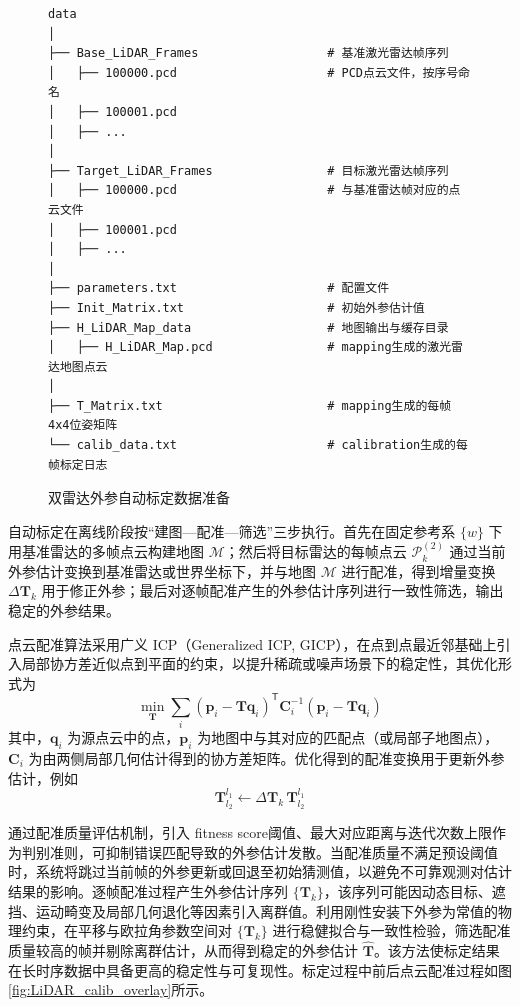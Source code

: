 \begin{figure}[htbp]
  \centering
  \begin{minipage}{0.88\textwidth}
    \footnotesize
\begin{verbatim}
data
│
├── Base_LiDAR_Frames                  # 基准激光雷达帧序列
│   ├── 100000.pcd                     # PCD点云文件，按序号命名
│   ├── 100001.pcd
│   ├── ...
│
├── Target_LiDAR_Frames                # 目标激光雷达帧序列
│   ├── 100000.pcd                     # 与基准雷达帧对应的点云文件
│   ├── 100001.pcd
│   ├── ...
│
├── parameters.txt                     # 配置文件
├── Init_Matrix.txt                    # 初始外参估计值
├── H_LiDAR_Map_data                   # 地图输出与缓存目录
│   ├── H_LiDAR_Map.pcd                # mapping生成的激光雷达地图点云
│
├── T_Matrix.txt                       # mapping生成的每帧4x4位姿矩阵
└── calib_data.txt                     # calibration生成的每帧标定日志
\end{verbatim}
  \end{minipage}
  \caption{双雷达外参自动标定数据准备}
  \label{fig:LiDAR_calib_dataset}
\end{figure}

自动标定在离线阶段按“建图—配准—筛选”三步执行。首先在固定参考系 $\{w\}$ 下用基准雷达的多帧点云构建地图 $\mathcal{M}$；然后将目标雷达的每帧点云 $\mathcal{P}_k^{(2)}$ 通过当前外参估计变换到基准雷达或世界坐标下，并与地图 $\mathcal{M}$ 进行配准，得到增量变换 $\Delta \mathbf{T}_k$ 用于修正外参；最后对逐帧配准产生的外参估计序列进行一致性筛选，输出稳定的外参结果。

点云配准算法采用广义 ICP（Generalized ICP, GICP），在点到点最近邻基础上引入局部协方差近似点到平面的约束，以提升稀疏或噪声场景下的稳定性，其优化形式为
\begin{equation}
\label{eq:gicp_cost}
\min_{\mathbf{T}}\sum_{i}\left(\mathbf{p}_i-\mathbf{T}\mathbf{q}_i\right)^{\mathsf{T}}\mathbf{C}_i^{-1}\left(\mathbf{p}_i-\mathbf{T}\mathbf{q}_i\right)
\end{equation}
其中，$\mathbf{q}_i$ 为源点云中的点，$\mathbf{p}_i$ 为地图中与其对应的匹配点（或局部子地图点），$\mathbf{C}_i$ 为由两侧局部几何估计得到的协方差矩阵。优化得到的配准变换用于更新外参估计，例如
\begin{equation}
\label{eq:extrinsic_update}
\mathbf{T}_{l_2}^{l_1}\leftarrow \Delta \mathbf{T}_k\,\mathbf{T}_{l_2}^{l_1}
\end{equation}

通过配准质量评估机制，引入 fitness score阈值、最大对应距离与迭代次数上限作为判别准则，可抑制错误匹配导致的外参估计发散。当配准质量不满足预设阈值时，系统将跳过当前帧的外参更新或回退至初始猜测值，以避免不可靠观测对估计结果的影响。逐帧配准过程产生外参估计序列 $\{\mathbf{T}_k\}$，该序列可能因动态目标、遮挡、运动畸变及局部几何退化等因素引入离群值。利用刚性安装下外参为常值的物理约束，在平移与欧拉角参数空间对 $\{\mathbf{T}_k\}$ 进行稳健拟合与一致性检验，筛选配准质量较高的帧并剔除离群估计，从而得到稳定的外参估计 $\hat{\mathbf{T}}$。该方法使标定结果在长时序数据中具备更高的稳定性与可复现性。标定过程中前后点云配准过程如图\ref{fig:LiDAR_calib_overlay}所示。

